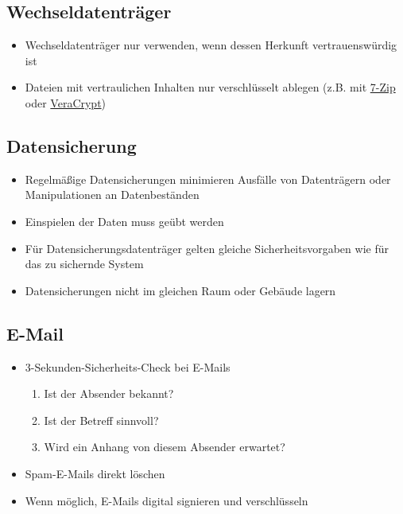 \subsection{Wechseldatenträger}

\begin{frame}
\begin{itemize}
	\item Wechseldatenträger nur verwenden, wenn dessen Herkunft vertrauenswürdig ist
	\item Dateien mit vertraulichen Inhalten nur verschlüsselt ablegen (z.B. mit \href{http://www.7-zip.de/}{7-Zip} oder \href{https://www.veracrypt.fr}{VeraCrypt})
\end{itemize}
\end{frame}

\subsection{Datensicherung}

\begin{frame}
\begin{itemize}
	\item Regelmäßige Datensicherungen minimieren Ausfälle von Datenträgern oder Manipulationen an Datenbeständen
	\item Einspielen der Daten muss geübt werden
	\item Für Datensicherungsdatenträger gelten gleiche Sicherheitsvorgaben wie für das zu sichernde System
	\item Datensicherungen nicht im gleichen Raum oder Gebäude lagern
\end{itemize}
\end{frame}

\subsection{E-Mail}

\begin{frame}
\begin{itemize}
	\item 3-Sekunden-Sicherheits-Check bei E-Mails
	\begin{enumerate}
		\item Ist der Absender bekannt?
		\item Ist der Betreff sinnvoll?
		\item Wird ein Anhang von diesem Absender erwartet?
	\end{enumerate}
	\item Spam-E-Mails direkt löschen
	\item Wenn möglich, E-Mails digital signieren und verschlüsseln
\end{itemize}
\end{frame}


